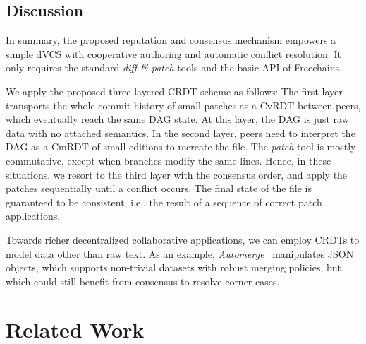 \documentclass[10pt,journal,compsoc]{IEEEtran}
\newcommand{\FC}       {Freechains\xspace}
\begin{document}
\subsection{Discussion}

In summary, the proposed reputation and consensus mechanism empowers a simple
dVCS with cooperative authoring and automatic conflict resolution.
It only requires the standard \emph{diff \& patch} tools and the basic API of
\FC.

We apply the proposed three-layered CRDT scheme as follows:
The first layer transports the whole commit history of small patches as a CvRDT
between peers, which eventually reach the same DAG state.
At this layer, the DAG is just raw data with no attached semantics.
%
In the second layer, peers need to interpret the DAG as a CmRDT of small
editions to recreate the file.
The \emph{patch} tool is mostly commutative, except when branches modify the
same lines.
%
Hence, in these situations, we resort to the third layer with the consensus
order, and apply the patches sequentially until a conflict occurs.
The final state of the file is guaranteed to be consistent, i.e., the result of
a sequence of correct patch applications.

Towards richer decentralized collaborative applications, we can employ CRDTs to
model data other than raw text.
As an example, \emph{Automerge}~\cite{p2p.automerge} manipulates JSON objects,
which supports non-trivial datasets with robust merging policies, but which
could still benefit from consensus to resolve corner cases.

\section{Related Work}
\label{sec.related}

\end{document}
